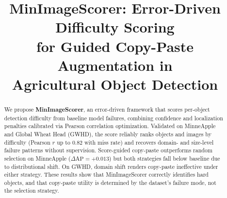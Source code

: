 \documentclass[conference]{IEEEtran}
\begin{document}
\title{MinImageScorer: Error-Driven Difficulty Scoring\\
for Guided Copy-Paste Augmentation in\\
Agricultural Object Detection}

\author{
\and
{}
\and
{}
}

\maketitle

\begin{abstract}
We propose \textbf{MinImageScorer}, an error-driven framework that
scores per-object detection difficulty from baseline model failures,
combining confidence and localization penalties calibrated via
Pearson correlation optimization. Validated on MinneApple and Global
Wheat Head (GWHD), the score reliably ranks objects and images by
difficulty (Pearson $r$ up to $0.82$ with miss rate) and recovers
domain- and size-level failure patterns without supervision.
Score-guided copy-paste outperforms random selection on MinneApple
($\Delta\mathrm{AP}{=}{+}0.013$) but both strategies fall below
baseline due to distributional shift. On GWHD, domain shift renders
copy-paste ineffective under either strategy. These results show
that MinImageScorer correctly identifies hard objects, and that
copy-paste utility is determined by the dataset's failure mode, not
the selection strategy.
\end{abstract}
\end{document}
